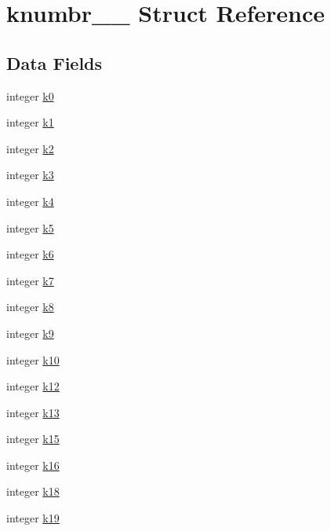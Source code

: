 \hypertarget{structknumbr__1__}{}\section{knumbr\+\_\+\_\+ Struct Reference}
\label{structknumbr__1__}
\subsection*{Data Fields}
\begin{DoxyCompactItemize}
\item 
integer \hyperlink{structknumbr__1___ab49ab847f32d22999d34d534b38acbdd}{k0}
\item 
integer \hyperlink{structknumbr__1___ac122d2150c4514daa2ea467de244eecf}{k1}
\item 
integer \hyperlink{structknumbr__1___a536a37c4b5395142244a8ce3e9f311b0}{k2}
\item 
integer \hyperlink{structknumbr__1___a13eae5ff7cefea5ccd47c77415c232b6}{k3}
\item 
integer \hyperlink{structknumbr__1___a21bd34af90286ae20f2550d688549e47}{k4}
\item 
integer \hyperlink{structknumbr__1___aa9a4e83e182e134ce043f234916062f3}{k5}
\item 
integer \hyperlink{structknumbr__1___ab0dff3dff5cc95d062d9111a352a7ddd}{k6}
\item 
integer \hyperlink{structknumbr__1___a4bcf4e5cc1c8baf9eee2c1688c07ea19}{k7}
\item 
integer \hyperlink{structknumbr__1___a95fd6fe777df43b231354d5ee9d0c40f}{k8}
\item 
integer \hyperlink{structknumbr__1___a1bd7365c8aa11544505cac688b7ab2af}{k9}
\item 
integer \hyperlink{structknumbr__1___ab1b0b2f6ac57708477e9deb25eac2ba4}{k10}
\item 
integer \hyperlink{structknumbr__1___a19aecd53014752bb918ef12446271e8f}{k12}
\item 
integer \hyperlink{structknumbr__1___aed5b3ba66bb633fc5ee3d7268fb17d96}{k13}
\item 
integer \hyperlink{structknumbr__1___aeba0db28411b28c32c89db1c2f3fb9a4}{k15}
\item 
integer \hyperlink{structknumbr__1___a3f9792bf82854766ea54fe4e3e468735}{k16}
\item 
integer \hyperlink{structknumbr__1___a499adaec260345830c650794e59f66eb}{k18}
\item 
integer \hyperlink{structknumbr__1___a149bd9f3eaa55da3733827d4525e2c8c}{k19}

\end{DoxyCompactItemize}
